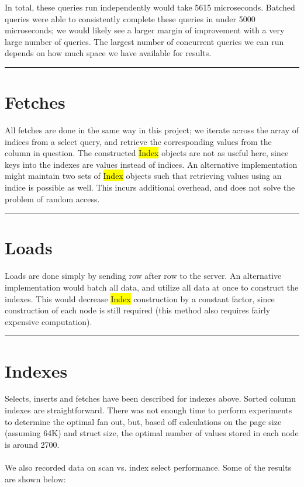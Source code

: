\documentclass[paper=letter, fontsize=11pt]{scrartcl}
\numberwithin{equation}{section}
\numberwithin{figure}{section}
\numberwithin{table}{section}
\newcommand{\horrule}[1]{\rule{\linewidth}{#1}}
\newcommand{\ttt}[1]{\hl{\ttfamily #1}}
\begin{document}
In total, these queries run independently would take 5615 microseconds.  Batched queries were able to consistently complete these queries in under 5000 microseconds; we would likely see a larger margin of improvement with a very large number of queries.  The largest number of concurrent queries we can run depends on how much space we have available for results.

\horrule{0.5pt}
\section{Fetches}
All fetches are done in the same way in this project; we iterate across the array of indices from a select query, and retrieve the corresponding values from the column in question.  The constructed \ttt{Index} objects are not as useful here, since keys into the indexes are values instead of indices.  An alternative implementation might maintain two sets of \ttt{Index} objects such that retrieving values using an indice is possible as well.  This incurs additional overhead, and does not solve the problem of random access.

\horrule{0.5pt}
\section{Loads}
Loads are done simply by sending row after row to the server.  An alternative implementation would batch all data, and utilize all data at once to construct the indexes.  This would decrease \ttt{Index} construction by a constant factor, since construction of each node is still required (this method also requires fairly expensive computation).

\horrule{0.5pt}
\section{Indexes}
Selects, inserts and fetches have been described for indexes above.  Sorted column indexes are straightforward.  There was not enough time to perform experiments to determine the optimal fan out, but, based off calculations on the page size (assuming 64K) and struct size, the optimal number of values stored in each node is around 2700.
\\\\We also recorded data on scan vs. index select performance.  Some of the results are shown below:
\end{document}
